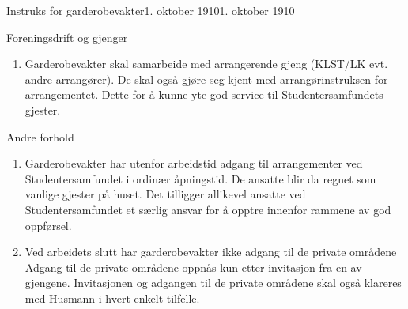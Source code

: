 \begin{instruks}{Instruks for garderobevakter}{1. oktober 1910}{1. oktober 1910}
    \begin{instruksledd}{Foreningsdrift og gjenger}
        \begin{enumerate}
            \item Garderobevakter skal samarbeide med arrangerende gjeng (KLST/LK evt. andre arrangører). De skal også gjøre seg
                kjent med arrangørinstruksen for arrangementet. Dette for å kunne yte god service til Studentersamfundets gjester.
        \end{enumerate}
    \end{instruksledd}

    \begin{instruksledd}{Andre forhold}
        \begin{enumerate}
            \item Garderobevakter har utenfor arbeidstid adgang til arrangementer ved Studentersamfundet i ordinær åpningstid. De
                ansatte blir da regnet som vanlige gjester på huset. Det tilligger allikevel ansatte ved Studentersamfundet et særlig
                ansvar for å opptre innenfor rammene av god oppførsel.
            \item Ved arbeidets slutt har garderobevakter ikke adgang til de private områdene Adgang til de private områdene oppnås
                kun etter invitasjon fra en av gjengene. Invitasjonen og adgangen til de private områdene skal også klareres med
                Husmann i hvert enkelt tilfelle.
        \end{enumerate}
    \end{instruksledd}

\end{instruks}

